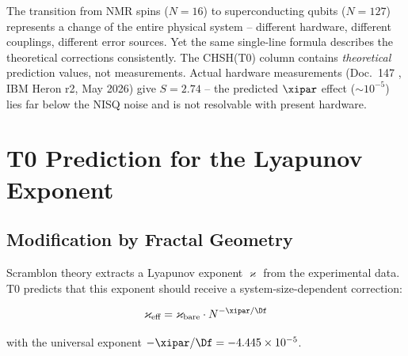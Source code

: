 \begin{keyresult}
	The transition from NMR spins ($N=16$) to superconducting qubits ($N=127$) represents a change of the entire physical system -- different hardware, different couplings, different error sources. Yet the same single-line formula describes the theoretical corrections consistently. The CHSH(T0) column contains \emph{theoretical} prediction values, not measurements. Actual hardware measurements (Doc.~147 \cite{pascher_quantum_computing_2025}, IBM Heron r2, May 2026) give $S = 2.74$ -- the predicted $\xipar$ effect ($\sim 10^{-5}$) lies far below the NISQ noise and is not resolvable with present hardware.
\end{keyresult}

\section{T0 Prediction for the Lyapunov Exponent}
\label{sec:lyapunov}

\subsection{Modification by Fractal Geometry}

Scramblon theory extracts a Lyapunov exponent $\varkappa$ from the experimental data. T0 predicts that this exponent should receive a system-size-dependent correction:

\begin{equation}
	\varkappa_{\text{eff}} = \varkappa_{\text{bare}} \cdot N^{-\xipar/\Df}
	\label{eq:lyapunov_correction}
\end{equation}

with the universal exponent $-\xipar/\Df = -4.445 \times 10^{-5}$.

\begin{table}[h]
	\centering
	\caption{Predicted T0 correction of the Lyapunov exponent}
	\label{tab:lyapunov}
\end{table}

